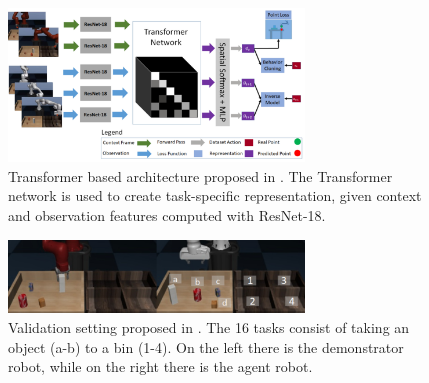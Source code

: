 \begin{figure}[t]
    \centering
    \includegraphics[width=0.7\textwidth]{figures/images/tosil/tosil_architecture.jpg}
    \caption{Transformer based architecture proposed in \cite{dasari2021transformers_one_shot}.  The Transformer network is used to create task-specific representation, given context and observation features computed with ResNet-18.}
    \label{fig:tosil_architecture}
\end{figure}

\begin{figure}[t]
    \centering
    \includegraphics[width=0.7\textwidth]{figures/images/tosil/tosil_task.jpg}
    \caption{Validation setting proposed in \cite{dasari2021transformers_one_shot}. The
    16 tasks consist of taking an object (a-b) to a bin (1-4). On the left there is the demonstrator robot, while on the right there is the agent robot.}
    \label{fig:tosil_task}
\end{figure}
